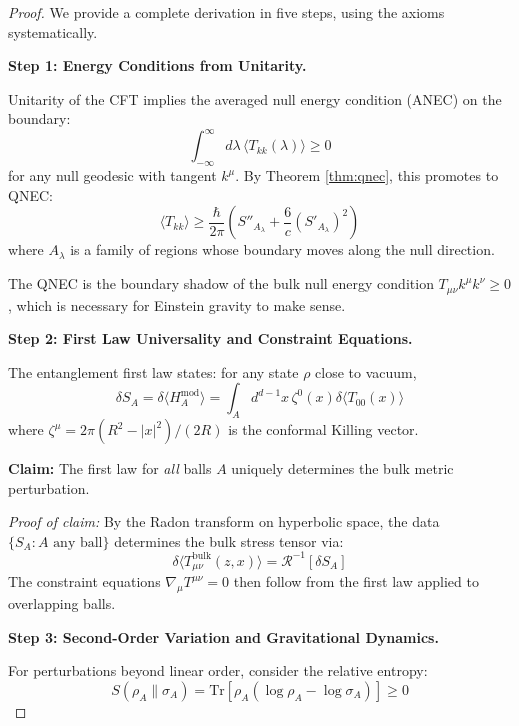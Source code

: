 \documentclass[12pt,a4paper]{article}
\begin{document}
\begin{proof}
We provide a complete derivation in five steps, using the axioms systematically.

\textbf{Step 1: Energy Conditions from Unitarity.}

Unitarity of the CFT implies the averaged null energy condition (ANEC) on the boundary:
\begin{equation}
\int_{-\infty}^\infty d\lambda \, \langle T_{kk}(\lambda) \rangle \geq 0
\end{equation}
for any null geodesic with tangent $k^\mu$. By Theorem \ref{thm:qnec}, this promotes to QNEC:
\begin{equation}
\langle T_{kk} \rangle \geq \frac{\hbar}{2\pi} \left( S''_{A_\lambda} + \frac{6}{c}(S'_{A_\lambda})^2 \right)
\end{equation}
where $A_\lambda$ is a family of regions whose boundary moves along the null direction.

The QNEC is the boundary shadow of the bulk null energy condition $T_{\mu\nu}k^\mu k^\nu \geq 0$, which is necessary for Einstein gravity to make sense.

\textbf{Step 2: First Law Universality and Constraint Equations.}

The entanglement first law states: for any state $\rho$ close to vacuum,
\begin{equation}
\delta S_A = \delta \langle H_A^{\text{mod}} \rangle = \int_A d^{d-1}x \, \zeta^0(x) \delta\langle T_{00}(x) \rangle
\end{equation}
where $\zeta^\mu = 2\pi(R^2 - |x|^2)/(2R)$ is the conformal Killing vector.

\textbf{Claim:} The first law for \emph{all} balls $A$ uniquely determines the bulk metric perturbation.

\textit{Proof of claim:} By the Radon transform on hyperbolic space, the data $\{S_A : A \text{ any ball}\}$ determines the bulk stress tensor via:
\begin{equation}
\delta\langle T_{\mu\nu}^{\text{bulk}}(z,x) \rangle = \mathcal{R}^{-1}\left[ \delta S_A \right]
\end{equation}
The constraint equations $\nabla_\mu T^{\mu\nu} = 0$ then follow from the first law applied to overlapping balls.

\textbf{Step 3: Second-Order Variation and Gravitational Dynamics.}

For perturbations beyond linear order, consider the relative entropy:
\begin{equation}
S(\rho_A \| \sigma_A) = \text{Tr}[\rho_A(\log\rho_A - \log\sigma_A)] \geq 0
\end{equation}


\end{proof}
\end{document}
